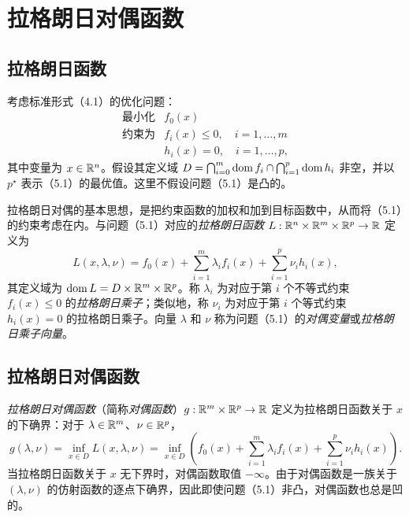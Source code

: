 \section{拉格朗日对偶函数}
\subsection{拉格朗日函数}
考虑标准形式（4.1）的优化问题：
\begin{equation}
\begin{array}{ll}
\text{最小化}&f_0(x)\\
\text{约束为}&f_i(x)\le0,\quad i=1,\ldots,m\\
&h_i(x)=0,\quad i=1,\ldots,p,
\end{array}\tag{5.1}
\end{equation}
其中变量为 $x\in\mathbb R^n$。假设其定义域
$D=\bigcap_{i=0}^m\operatorname{dom} f_i\cap\bigcap_{i=1}^p\operatorname{dom} h_i$ 非空，并以 $p^\star$ 表示（5.1）的最优值。这里不假设问题（5.1）是凸的。

拉格朗日对偶的基本思想，是把约束函数的加权和加到目标函数中，从而将（5.1）的约束考虑在内。与问题（5.1）对应的\emph{拉格朗日函数} $L:\mathbb R^n\times\mathbb R^m\times\mathbb R^p\to\mathbb R$ 定义为
\[
L(x,\lambda,\nu)=f_0(x)+\sum_{i=1}^m\lambda_i f_i(x)
+\sum_{i=1}^p\nu_i h_i(x),
\]
其定义域为 $\operatorname{dom} L=D\times\mathbb R^m\times\mathbb R^p$。称 $\lambda_i$ 为对应于第 $i$ 个不等式约束 $f_i(x)\le0$ 的\emph{拉格朗日乘子}；类似地，称 $\nu_i$ 为对应于第 $i$ 个等式约束 $h_i(x)=0$ 的拉格朗日乘子。向量 $\lambda$ 和 $\nu$ 称为问题（5.1）的\emph{对偶变量}或\emph{拉格朗日乘子向量}。

\subsection{拉格朗日对偶函数}
\emph{拉格朗日对偶函数}（简称\emph{对偶函数}）$g:\mathbb R^m\times\mathbb R^p\to\mathbb R$ 定义为拉格朗日函数关于 $x$ 的下确界：对于 $\lambda\in\mathbb R^m$、$\nu\in\mathbb R^p$，
\[
g(\lambda,\nu)=\inf_{x\in D}L(x,\lambda,\nu)
=\inf_{x\in D}\left(f_0(x)+\sum_{i=1}^m\lambda_i f_i(x)
+\sum_{i=1}^p\nu_i h_i(x)\right).
\]
当拉格朗日函数关于 $x$ 无下界时，对偶函数取值 $-\infty$。由于对偶函数是一族关于 $(\lambda,\nu)$ 的仿射函数的逐点下确界，因此即使问题（5.1）非凸，对偶函数也总是凹的。

